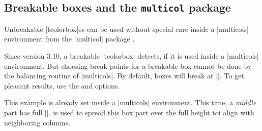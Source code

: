 \subsection{Breakable boxes and the \texttt{multicol} package}\label{subsec:multicol}
\begin{multicols}{2}
\begin{tcolorbox}[enhanced jigsaw,size=small,breakable,colback=yellow!10!white,
  colframe=red!50!white,break at=3cm,height fixed for=all]
Unbreakable |tcolorbox|es can be used without special care inside a
|multicols| environment from the |multicol| package \cite{mittelbach:2014a}.

Since version 3.10, a breakable |tcolorbox| detects, if it is used inside
a |multicols| environment. But choosing break points for a breakable box
cannot be done by the balancing routine of |multicols|. By default, boxes
will break at |\textheight|. To get pleasant results, use the
 and  options.
\end{tcolorbox}
\end{multicols}

\enlargethispage{\baselineskip}
\begin{dispListing}
\small
\begin{multicols}{2}
  \lipsum[1]
  \begin{tcolorbox}[enhanced jigsaw,breakable,size=title,
    colback=red!5!white,colframe=red!75!black,fonttitle=\bfseries,
    title=My breakable box,pad at break=1mm, break at=7.5cm/0pt ]
  \lipsum[2-4]
  \end{tcolorbox}
  \lipsum[4]
\end{multicols}
\end{dispListing}
{\tcbusetemp}

\clearpage

\begin{multicols}{2}
\small
This example is already set inside a |multicols| environment.
This time, a \emph{middle} part has full |\textheight|.
 is used to spread this box part over the full
height toi align with neighboring columns.
\begin{dispListing}
\lipsum[1]
\begin{tcolorbox}[enhanced jigsaw,breakable,
  size=title,
  colback=red!5!white,
  colframe=red!75!black,
  fonttitle=\bfseries,
  title=My breakable box,
  pad at break=2mm,
  break at=8.2cm/0pt,
  height fixed for=middle ]
\lipsum[2-7]
\end{tcolorbox}
\lipsum[8]
\end{dispListing}
{\tcbusetemp}
\end{multicols}


